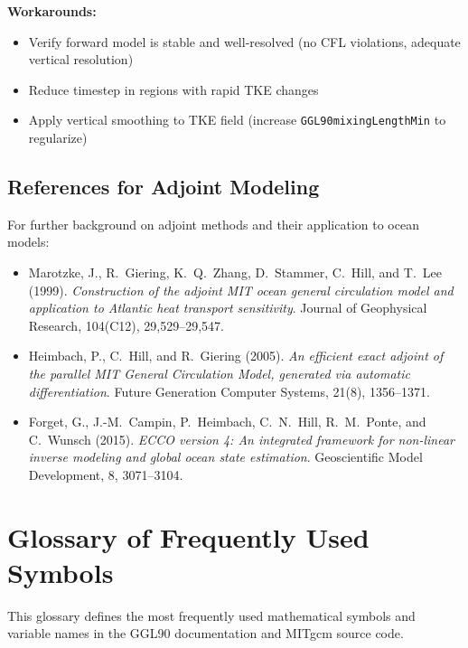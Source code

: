 \documentclass[12pt,letterpaper]{article}
\begin{document}
\textbf{Workarounds:}
\begin{itemize}[leftmargin=*]
  \item Verify forward model is stable and well-resolved (no CFL violations, adequate vertical resolution)
  \item Reduce timestep in regions with rapid TKE changes
  \item Apply vertical smoothing to TKE field (increase \texttt{GGL90mixingLengthMin} to regularize)
\end{itemize}

\subsection{References for Adjoint Modeling}

For further background on adjoint methods and their application to ocean models:

\begin{itemize}[leftmargin=*]
  \item Marotzke, J., R.\ Giering, K.\ Q.\ Zhang, D.\ Stammer, C.\ Hill, and T.\ Lee (1999). \textit{Construction of the adjoint MIT ocean general circulation model and application to Atlantic heat transport sensitivity}. Journal of Geophysical Research, 104(C12), 29,529--29,547.

  \item Heimbach, P., C.\ Hill, and R.\ Giering (2005). \textit{An efficient exact adjoint of the parallel MIT General Circulation Model, generated via automatic differentiation}. Future Generation Computer Systems, 21(8), 1356--1371.

  \item Forget, G., J.-M.\ Campin, P.\ Heimbach, C.\ N.\ Hill, R.\ M.\ Ponte, and C.\ Wunsch (2015). \textit{ECCO version 4: An integrated framework for non-linear inverse modeling and global ocean state estimation}. Geoscientific Model Development, 8, 3071--3104.
\end{itemize}

\section{Glossary of Frequently Used Symbols}
\label{app:glossary}

This glossary defines the most frequently used mathematical symbols and variable names in the GGL90 documentation and MITgcm source code.
\end{document}
